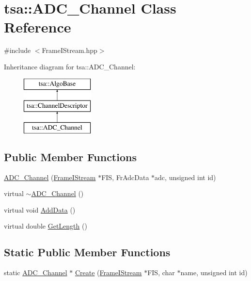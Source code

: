 \hypertarget{classtsa_1_1_a_d_c___channel}{}\section{tsa\+:\+:A\+D\+C\+\_\+\+Channel Class Reference}
\label{classtsa_1_1_a_d_c___channel}


{\ttfamily \#include $<$Frame\+I\+Stream.\+hpp$>$}

Inheritance diagram for tsa\+:\+:A\+D\+C\+\_\+\+Channel\+:\begin{figure}[H]
\begin{center}
\leavevmode
\includegraphics[height=3.000000cm]{classtsa_1_1_a_d_c___channel}
\end{center}
\end{figure}
\subsection*{Public Member Functions}
\begin{DoxyCompactItemize}
\item 
\hyperlink{classtsa_1_1_a_d_c___channel_a18595131ed55a3488ef56cfc0b39611d}{A\+D\+C\+\_\+\+Channel} (\hyperlink{classtsa_1_1_frame_i_stream}{Frame\+I\+Stream} $\ast$F\+IS, Fr\+Adc\+Data $\ast$adc, unsigned int id)
\item 
virtual \hyperlink{classtsa_1_1_a_d_c___channel_a0f9c5bbb98da25e712d4f6f8c078e658}{$\sim$\+A\+D\+C\+\_\+\+Channel} ()
\item 
virtual void \hyperlink{classtsa_1_1_a_d_c___channel_a23052bc47591e46246701ec0573c7902}{Add\+Data} ()
\item 
virtual double \hyperlink{classtsa_1_1_a_d_c___channel_ab5e23c219a7bf70866b05c9d3ad3da6f}{Get\+Length} ()
\end{DoxyCompactItemize}
\subsection*{Static Public Member Functions}
\begin{DoxyCompactItemize}
\item 
static \hyperlink{classtsa_1_1_a_d_c___channel}{A\+D\+C\+\_\+\+Channel} $\ast$ \hyperlink{classtsa_1_1_a_d_c___channel_a4585997f9f0029bb8d6fee7d36d33c92}{Create} (\hyperlink{classtsa_1_1_frame_i_stream}{Frame\+I\+Stream} $\ast$F\+IS, char $\ast$name, unsigned int id)
\end{DoxyCompactItemize}
